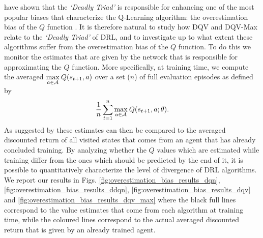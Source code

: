\citet{van2018deep} have shown that the \textit{`Deadly Triad'} is responsible for enhancing one of the most popular biases that characterize the Q-Learning algorithm: the overestimation bias of the $Q$ function \cite{hasselt2010double}. It is therefore natural to study how DQV and DQV-Max relate to the \textit{`Deadly Triad'} of DRL, and to investigate up to what extent these algorithms suffer from the overestimation bias of the $Q$ function. To do this we monitor the estimates that are given by the network that is responsible for approximating the $Q$ function. More specifically, at training time, we compute the averaged $\underset{a \in \cal A}{\max}\:Q(s_{t+1}, a)$ over a set ($n$) of full evaluation episodes as defined by 
\begin{equation}
\frac{1}{n}\sum_{t=1}^{n}\underset{a \in \cal A}{\max}\:Q(s_{t+1}, a;\theta).
\end{equation}
As suggested by \citet{van2016deep} these estimates can then be compared to the averaged discounted return of all visited states that comes from an agent that has already concluded training. By analyzing whether the $Q$ values which are estimated while training differ from the ones which should be predicted by the end of it, it is possible to quantitatively characterize the level of divergence of DRL algorithms. We report our results in Figs. \ref{fig:overestimation_bias_results_dqn}, \ref{fig:overestimation_bias_results_ddqn}, \ref{fig:overestimation_bias_results_dqv} and \ref{fig:overestimation_bias_results_dqv_max} where the black full lines correspond to the value estimates that come from each algorithm at training time, while the coloured lines correspond to the actual averaged discounted return that is given by an already trained agent.


